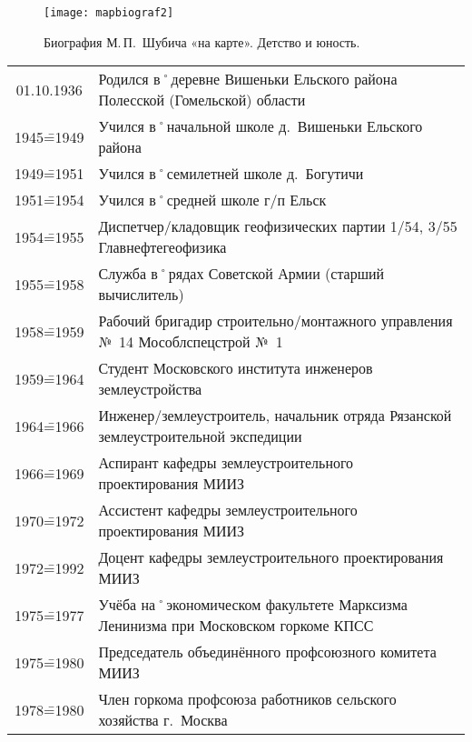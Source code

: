 \clearpage

\begin{figure}[h]
\texttt{[image: mapbiograf2]}
\caption{Биография М.\,П.~Шубича «на карте». Детство и юность.}
\label{fig:mapbiograf2}
\end{figure}

\clearpage

\begin{table}[tH]
{\small
	\begin{tabularx}{\textwidth}{cX}
		01.10.1936	&	Родился в˚деревне Вишеньки Ельского района Полесской (Гомельской) области			\\
		1945\==1949		&	Учился в˚начальной школе д.~Вишеньки Ельского района								\\
		1949\==1951		&	Учился в˚семилетней школе д.~Богутичи												\\
		1951\==1954		&	Учился в˚средней школе г/п Ельск													\\
		1954\==1955		&	Диспетчер\-/кладовщик геофизических партии 1/54, 3/55 Главнефтегеофизика				\\
		1955\==1958		&	Служба в˚рядах Советской Армии (старший вычислитель)								\\
		1958\==1959		&	Рабочий бригадир строительно\-/монтажного управления №~14 Мособлспецстрой №~1		\\
		1959\==1964		&	Студент Московского института инженеров землеустройства							\\
		1964\==1966		&	Инженер\-/землеустроитель, начальник отряда Рязанской землеустроительной экспедиции	\\
		1966\==1969		&	Аспирант кафедры землеустроительного проектирования МИИЗ							\\
		1970\==1972		&	Ассистент кафедры землеустроительного проектирования МИИЗ							\\
		1972\==1992		&	Доцент кафедры землеустроительного проектирования МИИЗ								\\
		1975\==1977		&	Учёба на˚экономическом факультете Марксизма Ленинизма при Московском горкоме КПСС	\\
		1975\==1980		&	Председатель объединённого профсоюзного комитета МИИЗ								\\
		1978\==1980		&	Член горкома профсоюза работников сельского хозяйства г.~Москва						\\

\end{tabularx}}
\end{table}
